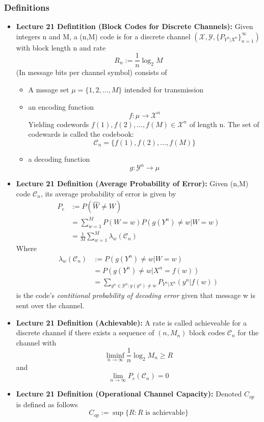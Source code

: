 \documentclass{article}
\begin{document}
\subsubsection{Definitions}
\begin{itemize}
    \item \textbf{Lecture 21 Defintition (Block Codes for Discrete Channels): }
    Given integers n and M, a (n,M) code is for a discrete channel \((\mathcal{X}, \mathcal{Y}, \{P_{Y^n|X^n}\}_{n=1}^\infty)\) with block length n and rate
    \[R_n := \frac{1}{n} \log_2 M\]
    (In message bits per channel symbol) consists of
    \begin{itemize}
        \item A mssage set \(\mu = \{1,2,\ldots, M\}\) intended for transmission
        \item an encoding function
        \[f: \mu \to \mathcal{X}^n\]
        Yielding codewords \(f(1), f(2), \ldots, f(M) \in \mathcal{X}^n\) of length n. The set of codewards is called the codebook:
        \[\mathcal{C}_n = \{f(1), f(2), \ldots, f(M)\}\]
        \item a decoding function
        \[g: \mathcal{Y}^n \to \mu\]
    \end{itemize}
    \item \textbf{Lecture 21 Definition (Average Probability of Error): } Given (n,M) code \(\mathcal{C}_n\), its average probability of error is given by
    \begin{align*}
        P_e & :=P(\hat{W} \neq W) \\
        & = \sum_{w=1}^M P(W=w) P(g(Y^n)\neq w|W=w) \\
        & = \frac{1}{M} \sum_{w=1}^M \lambda_w(\mathcal{C}_n)
    \end{align*}
    Where
    \begin{align*}
        \lambda_w(\mathcal{C}_n)&:= P(g(Y^n) \neq w | W = w) \\
        & = P(g(Y^n)\neq w |X^n = f(w)) \\
        & = \sum_{y^n \in \mathcal{Y}^n: g(y^n) \neq w} P_{Y^n|X^n}(y^n | f(w))
    \end{align*}
    is the code's \textit{contitional probability of decoding error} given that message w is sent over the channel.
    \item \textbf{Lecture 21 Definition (Achievable): } A rate is called achieveable for a discrete channel if there exists a sequence of \((n, M_n)\) block codes \(\mathcal{C}_n\)
    for the channel with
    \[\liminf_{n \to \infty} \frac{1}{n} \log_2 M_n \geq R\]
    and 
    \[\lim_{n \to \infty} P_e(\mathcal{C}_n) = 0\]
    \item \textbf{Lecture 21 Definition (Operational Channel Capacity): } Denoted \(C_{op}\) is defined as follows
    \[C_{op} := \sup \{R: R \text{ is achievable}\}\]


\end{itemize}
\end{document}
